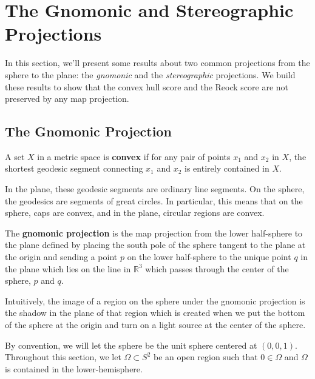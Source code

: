 \section{The Gnomonic and Stereographic Projections}
In this section, we'll present some results about two common projections from the sphere to the plane: 
the \textit{gnomonic} and the \textit{stereographic} projections.  We build these results to show that the 
convex hull score and the Reock score are not preserved by any map projection.

\subsection{The Gnomonic Projection}


\begin{definition}
	A set $X$ in a metric space is \textbf{convex} if for any pair of
	points $x_1$ and $x_2$ in $X$, the shortest geodesic segment
	connecting $x_1$ and $x_2$ is entirely contained in $X$. 
\end{definition}
In the plane, these geodesic segments are ordinary line segments.  On
the sphere, the geodesics are segments of great circles. In 
particular, this means that on the sphere, caps are 
convex, and in the plane, circular regions are convex.






\begin{definition}
	The \textbf{gnomonic projection} is the map projection from the
	lower half-sphere to the plane defined by placing the south pole of
	the sphere tangent to the plane at the origin and sending a point
	$p$ on the lower half-sphere to the unique point $q$ in the plane
	which lies on the line in $\mathbb{R}^3$ which passes through the
	center of the sphere, $p$ and $q$.
\end{definition}
Intuitively, the image of a region on the sphere under the gnomonic
projection is the shadow in the plane of that region which is
created when we put the bottom of the sphere at the origin and turn
on a light source at the center of the sphere.

By convention, we will let the sphere be the unit sphere 
centered at $(0,0,1)$. Throughout this section, we let 
$\Omega\subset S^2$ be an open region such that $0\in \Omega$ 
and $\Omega$ is contained in the lower-hemisphere. 


